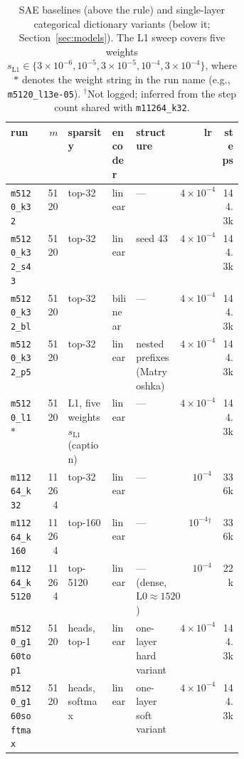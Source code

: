 \begin{table}[tp]
\vspace{8pt}
{\footnotesize\setlength{\tabcolsep}{4pt}%
\begin{tabular}{@{}lr>{\raggedright\arraybackslash}p{0.19\linewidth}l%
>{\raggedright\arraybackslash}p{0.19\linewidth}rr@{}}
\toprule
run & $m$ & sparsity & encoder & structure & lr & steps \\
\midrule
\texttt{m5120\_k32} & 5120 & top-32 & linear & --- & $4\times10^{-4}$ & 144.3k \\
\texttt{m5120\_k32\_s43} & 5120 & top-32 & linear & seed 43 & $4\times10^{-4}$ & 144.3k \\
\texttt{m5120\_k32\_bl} & 5120 & top-32 & bilinear & --- & $4\times10^{-4}$ & 144.3k \\
\texttt{m5120\_k32\_p5} & 5120 & top-32 & linear & 5 nested prefixes (Matryoshka) & $4\times10^{-4}$ & 144.3k \\
\texttt{m5120\_l1}$\ast$ & 5120 & L1, five weights $s_{\mathrm{L1}}$ (caption) & linear & --- & $4\times10^{-4}$ & 144.3k \\
\texttt{m11264\_k32} & 11264 & top-32 & linear & --- & $10^{-4}$ & 336k \\
\texttt{m11264\_k160} & 11264 & top-160 & linear & --- & $10^{-4}$$^\dagger$ & 336k \\
\texttt{m11264\_k5120} & 11264 & top-5120 & linear & --- (dense, $\mathrm{L0} \approx 1520$) & $10^{-4}$ & 22k \\
\midrule
\texttt{m5120\_g160top1} & 5120 & 160 heads, top-1 & linear & one-layer hard variant & $4\times10^{-4}$ & 144.3k \\
\texttt{m5120\_g160softmax} & 5120 & 160 heads, softmax & linear & one-layer soft variant & $4\times10^{-4}$ & 144.3k \\
\bottomrule
\end{tabular}}
\caption{SAE baselines (above the rule) and single-layer categorical
dictionary variants
(below it; Section~\ref{sec:models}). The L1 sweep covers five weights
$s_{\mathrm{L1}} \in \{3\times10^{-6}, 10^{-5}, 3\times10^{-5}, 10^{-4}, 3\times10^{-4}\}$,
where $\ast$ denotes the weight string in the run name
(e.g., \texttt{m5120\_l13e-05}). $^\dagger$Not logged; inferred from the
step count shared with \texttt{m11264\_k32}.}
\label{tab:cfg-sae}
\end{table}

